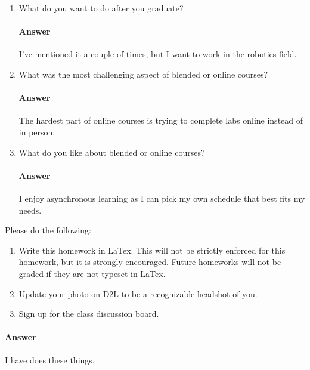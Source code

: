 \documentclass{article}
\begin{document}
\begin{enumerate}
    \item What do you want to do after you graduate?
        \paragraph{Answer} I've mentioned it a couple of times, but I want to work in the robotics field.

    \item What was the most challenging aspect of blended or online courses?
	\paragraph{Answer} The hardest part of online courses is trying to complete labs online instead of in person.

    \item What do you like about blended or online courses?
	\paragraph{Answer} I enjoy asynchronous learning as I can pick my own schedule that best fits my needs.

\end{enumerate}


Please do the following:
\begin{enumerate}
    \item Write this homework in LaTex. This will not be strictly enforced for
        this homework, but it is strongly encouraged.  Future homeworks will not
        be graded if they are not typeset in LaTex.
    \item Update your photo on D2L to be a recognizable headshot of you.
    \item Sign up for the class discussion board.
\end{enumerate}
	\paragraph{Answer} I have does these things.


\end{document}
